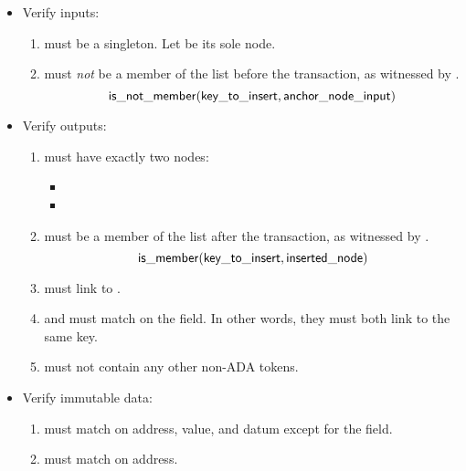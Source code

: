 \documentclass[../midgard.tex]{subfiles}
\begin{document}
\begin{description}
\begin{itemize}
            \item Verify inputs:
            \begin{enumerate}[resume]
                \item {} must be a singleton.
                  Let  be its sole node.
                \item {} must \emph{not} be a member of the list before the transaction, as witnessed by .
                    \begin{equation*}
                        \mathsf{is\_not\_member} (\mathsf{key\_to\_insert}, \mathsf{anchor\_node\_input})
                    \end{equation*}
            \end{enumerate}
            
            \item Verify outputs:
            \begin{enumerate}[resume]
                \item {} must have exactly two nodes:
                    \begin{itemize}
                        \item {}
                        \item {}  
                    \end{itemize}
                \item {} must be a member of the list after the transaction, as witnessed by .
                    \begin{equation*}
                        \mathsf{is\_member} (\mathsf{key\_to\_insert}, \mathsf{inserted\_node})
                    \end{equation*}
                \item {} must link to .
                \item {} and  must match on the  field.
                  In other words, they must both link to the same key.
                \item {} must not contain any other non-ADA tokens.
            \end{enumerate}
            
            \item Verify immutable data:
            \begin{enumerate}[resume]
                \item {} must match  on address, value, and datum except for the  field.
                \item {} must match  on address.
            \end{enumerate}
        \end{itemize}
        

\end{description}
\end{document}
